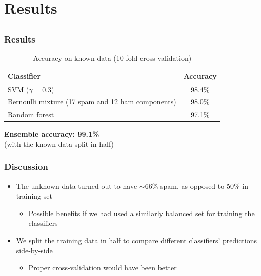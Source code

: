 \documentclass{beamer}
\begin{document}
\section{Results}
\subsection{}
\frame
{
  \frametitle{Results}

{\scriptsize
\begin{table}
\hspace{1.0cm}
\caption{Accuracy on known data (10-fold cross-validation)}
\begin{tabular}{l|c}
Classifier & Accuracy \\ \hline
SVM ($\gamma = 0.3$) & 98.4\% \\
Bernoulli mixture (17 spam and 12 ham components) & 98.0\% \\
Random forest & 97.1\% \\
\end{tabular}
\end{table}
}
\hspace{1.0cm}

{\bf Ensemble accuracy: 99.1\%} \\
(with the known data split in half)
}

\frame
{
    \frametitle{Discussion}
    \begin{itemize}
        \item The unknown data turned out to have $\sim66\%$ spam, as opposed to 50\% in training set
        \begin{itemize}
            \item Possible benefits if we had used a similarly balanced set for training the classifiers
        \end{itemize}
        \item We split the training data in half to compare different classifiers' predictions side-by-side
        \begin{itemize}
            \item Proper cross-validation would have been better
        \end{itemize}
    \end{itemize}
}
\end{document}
